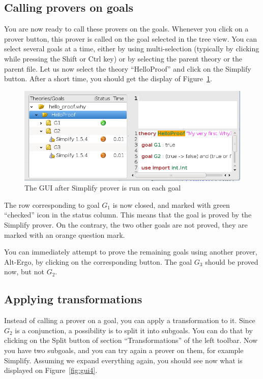\subsection{Calling provers on goals}

You are now ready to call these provers on the goals. Whenever you
click on a prover button, this prover is called on the goal selected
in the tree view. You can select several goals at a time, either
by using multi-selection (typically by clicking while pressing the
\textsf{Shift} or \textsf{Ctrl} key) or by selecting the parent theory
or the parent file. Let us now select the theory ``HelloProof'' and
click on the \textsf{Simplify} button. After a short time, you should
get the display of Figure~\ref{fig:gui3}.

\begin{figure}[tbp]
  \includegraphics[width=\textwidth]{gui3.png}
  \caption{The GUI after Simplify prover is run on each goal}
  \label{fig:gui3}
\end{figure}

The row corresponding to goal $G_1$ is now closed, and marked with
green ``checked'' icon in the status column. This means that the goal
is proved by the Simplify prover. On the contrary, the two other goals
are not proved, they are marked with an orange question mark.

You can immediately attempt to prove the remaining goals using another
prover, {\eg} Alt-Ergo, by clicking on the corresponding button. The
goal $G_3$ should be proved now, but not $G_2$.

\subsection{Applying transformations}

Instead of calling a prover on a goal, you can apply a transformation
to it.  Since $G_2$ is a conjunction, a possibility is to split it
into subgoals. You can do that by clicking on the \textsf{Split}
button of section ``Transformations'' of the left toolbar. Now you
have two subgoals, and you can try again a prover on them, for example
Simplify. Assuming we expand everything again, you should see now what
is displayed on Figure~\ref{fig:gui4}.

